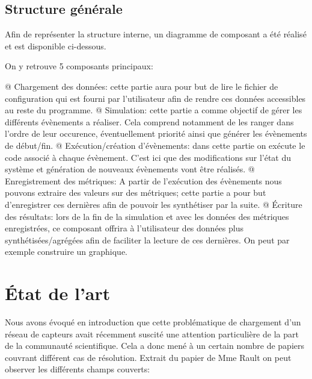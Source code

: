 \documentclass[noposter,final]{polytech/polytech}
\begin{document}
			
	\section{Structure générale}
		Afin de représenter la structure interne, un diagramme de composant a été réalisé et est disponible ci-dessous.
		
		
		On y retrouve 5 composants principaux:
		\begin{easylist}[itemize]
			@ Chargement des données: cette partie aura pour but de lire le fichier de configuration qui est fourni par l'utilisateur afin de rendre ces données accessibles au reste du programme.
			@ Simulation: cette partie a comme objectif de gérer les différents évènements a réaliser. Cela comprend notamment de les ranger dans l'ordre de leur occurence, éventuellement priorité ainsi que générer les évènements de début/fin.
			@ Exécution/création d'évènements: dans cette partie on exécute le code associé à chaque évènement. C'est ici que des modifications sur l'état du système et génération de nouveaux évènements vont être réalisés.
			@ Enregistrement des métriques: A partir de l'exécution des évènements nous pouvons extraire des valeurs sur des métriques; cette partie a pour but d'enregistrer ces dernières afin de pouvoir les synthétiser par la suite.
			@ Écriture des résultats: lors de la fin de la simulation et avec les données des métriques enregistrées, ce composant offrira à l'utilisateur des données plus synthétisées/agrégées afin de faciliter la lecture de ces dernières. On peut par exemple construire un graphique.	
		\end{easylist}

\chapter{État de l'art}
	Nous avons évoqué en introduction que cette problématique de chargement d'un réseau de capteurs avait récemment suscité une attention particulière de la part de la communauté scientifique.
	Cela a donc mené à un certain nombre de papiers couvrant différent cas de résolution.
	Extrait du papier de Mme Rault \cite{Rault:chargers} on peut observer les différents champs couverts:
	
\end{document}
